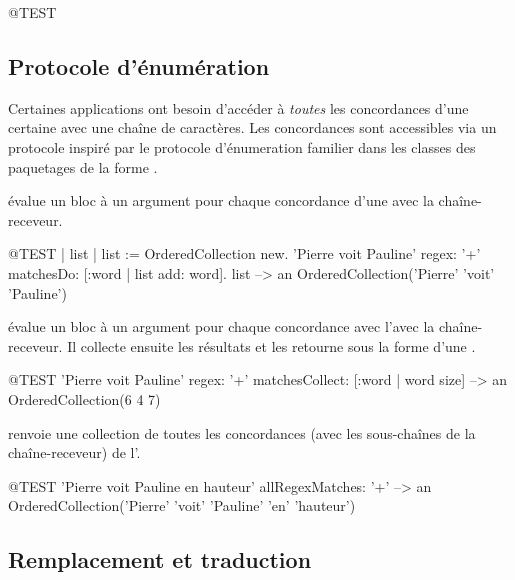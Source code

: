 \documentclass[a4paper,10pt,twoside]{book}
\begin{document}
\begin{code}{@TEST}
\subsection{Protocole d'énumération}

Certaines applications ont besoin d'accéder à \emph{toutes} les
concordances d'une certaine \expreg avec une chaîne de caractères.
Les concordances sont accessibles via un protocole inspiré par le
protocole d'énumeration 
familier dans les classes des paquetages de la forme .

 évalue un bloc à un argument pour
chaque concordance d'une \expreg avec la chaîne-receveur.

\begin{code}{@TEST | list |}
list := OrderedCollection new.
'Pierre voit Pauline' regex: '\w+' matchesDo: [:word | list add: word].
list --> an OrderedCollection('Pierre' 'voit' 'Pauline')
\end{code}

 évalue un bloc à un argument
pour chaque concordance avec l'\expreg avec la chaîne-receveur. Il
collecte ensuite les résultats et les retourne sous la forme d'une
 .

\begin{code}{@TEST}
'Pierre voit Pauline' regex: '\w+' matchesCollect: [:word | word size]                          --> an OrderedCollection(6 4 7)
\end{code}

 renvoie une collection de toutes les
concordances (avec les sous-chaînes de la chaîne-receveur) de l'\expreg.

\begin{code}{@TEST}
'Pierre voit Pauline en hauteur' allRegexMatches: '\w+' --> an OrderedCollection('Pierre' 'voit' 'Pauline' 'en' 'hauteur')
\end{code}

\subsection{Remplacement et traduction}


\end{code}
\end{document}
